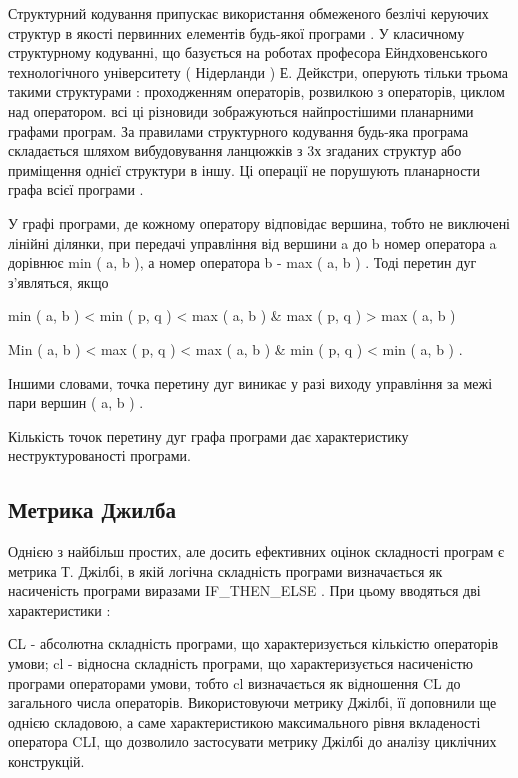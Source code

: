 Структурний кодування припускає використання обмеженого безлічі керуючих структур в якості первинних елементів будь-якої програми . У класичному структурному кодуванні, що базується на роботах професора Ейндховенського технологічного університету ( Нідерланди ) Е. Дейкстри, оперують тільки трьома такими структурами : проходженням операторів, розвилкою з операторів, циклом над оператором. всі ці різновиди зображуються найпростішими планарними графами програм. За правилами структурного кодування будь-яка програма складається шляхом вибудовування ланцюжків з 3х згаданих структур або приміщення однієї структури в іншу. Ці операції не порушують планарности графа всієї програми .

У графі програми, де кожному оператору відповідає вершина, тобто не виключені лінійні ділянки, при передачі управління від вершини a до b номер оператора a дорівнює min ( a, b ), а номер оператора b - max ( a, b ) . Тоді перетин дуг з'являться, якщо

min ( a, b ) \textless{} min ( p, q ) \textless{} max ( a, b ) \& max ( p, q ) \textgreater{} max ( a, b ) \textbar{}

\begin{list}{0em}
\item[] Min ( a, b ) \textless{} max ( p, q ) \textless{} max ( a, b ) \& min ( p, q ) \textless{} min ( a, b ) .
\end{list}

Іншими словами, точка перетину дуг виникає у разі виходу управління за межі пари вершин ( a, b ) .

Кількість точок перетину дуг графа програми дає характеристику неструктурованості програми.


\subsection{Метрика Джилба}
\label{2section:id12}
Однією з найбільш простих, але досить ефективних оцінок складності програм є метрика Т. Джілбі, в якій логічна складність програми визначається як насиченість програми виразами IF\_THEN\_ELSE . При цьому вводяться дві характеристики :

СL - абсолютна складність програми, що характеризується кількістю операторів умови;
cl - відносна складність програми, що характеризується насиченістю програми операторами умови, тобто cl визначається як відношення CL до загального числа операторів.
Використовуючи метрику Джілбі, її доповнили ще однією складовою, а саме характеристикою максимального рівня вкладеності оператора CLI, що дозволило застосувати метрику Джілбі до аналізу циклічних конструкцій.

